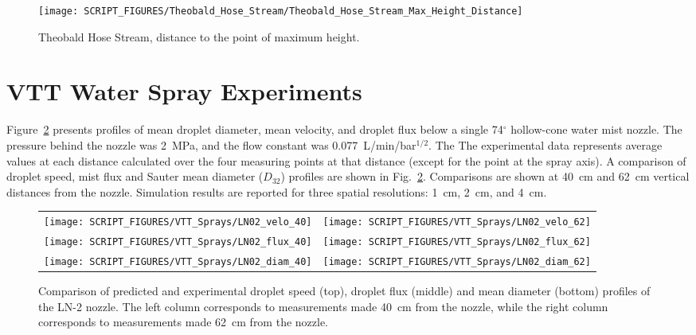 \begin{figure}[!ht]
\begin{center}
\texttt{[image: SCRIPT\_FIGURES/Theobald\_Hose\_Stream/Theobald\_Hose\_Stream\_Max\_Height\_Distance]}
\caption[Theobald Hose Stream distance to max height]{Theobald Hose Stream, distance to the point of maximum height.}
\label{fig:Theobald_max_height_distance}
\end{center}
\end{figure}


\clearpage

\section{VTT Water Spray Experiments}

Figure~\ref{LN02} presents profiles of mean droplet diameter, mean velocity, and droplet flux below a single 74$^\circ$ hollow-cone water mist nozzle. The pressure behind the nozzle was 2~MPa, and the flow constant was 0.077~L/min/bar$^{1/2}$. The The experimental data represents average values at each distance calculated over the four measuring points at that distance (except for the point at the spray axis). A comparison of droplet speed, mist flux and Sauter mean diameter ($D_{32}$) profiles are shown in Fig.~\ref{LN02}. Comparisons are shown at 40~cm and 62~cm vertical distances from the nozzle. Simulation results are reported for three spatial resolutions: 1~cm, 2~cm, and 4~cm.

\begin{figure}
\begin{tabular*}{\textwidth}{l@{\extracolsep{\fill}}r}
\texttt{[image: SCRIPT\_FIGURES/VTT\_Sprays/LN02\_velo\_40]} &
\texttt{[image: SCRIPT\_FIGURES/VTT\_Sprays/LN02\_velo\_62]}  \\
\texttt{[image: SCRIPT\_FIGURES/VTT\_Sprays/LN02\_flux\_40]} &
\texttt{[image: SCRIPT\_FIGURES/VTT\_Sprays/LN02\_flux\_62]}  \\
\texttt{[image: SCRIPT\_FIGURES/VTT\_Sprays/LN02\_diam\_40]} &
\texttt{[image: SCRIPT\_FIGURES/VTT\_Sprays/LN02\_diam\_62]}  \\
\end{tabular*}
\caption[Droplet speed, flux, and mean diameter profiles of the LN-2 nozzle]{Comparison of predicted and experimental droplet speed (top), droplet flux (middle) and mean diameter (bottom) profiles of the LN-2 nozzle. The left column corresponds to measurements made 40~cm from the nozzle, while the right column corresponds to measurements made 62~cm from the nozzle.}
\label{LN02}
\end{figure}

